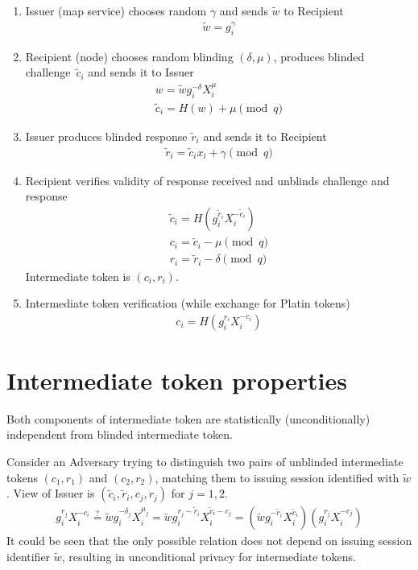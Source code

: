 \documentclass[a4paper,12pt]{article}
\begin{document}
\begin{enumerate}
\item
  Issuer (map service) chooses random $\gamma$
  and sends $\tilde w$ to Recipient
\begin{gather}
  \tilde w = g_i^{\gamma}
\end{gather}
  
\item
  Recipient (node) chooses random blinding $(\delta, \mu)$,
  produces blinded challenge~$\tilde c_i$ and sends it to Issuer
\begin{gather}
  w = \tilde w g_i^{-\delta} X_i^{\mu} \\
  \tilde c_i = H(w) + \mu  \pmod{q}
\end{gather}
\item
  Issuer produces blinded response $\tilde r_i$ and sends it to Recipient
\begin{gather}
  \tilde r_i = \tilde c_i x_i + \gamma  \pmod{q}
\end{gather}
\item
  Recipient verifies validity of response received and
  unblinds challenge and response
\begin{gather}
  \tilde c_i = H(g_i^{\tilde r_i} X_i^{- \tilde c_i}) \\
  c_i = \tilde c_i - \mu  \pmod{q} \\
  r_i = \tilde r_i - \delta  \pmod{q}
\end{gather}
  Intermediate token is $(c_i, r_i)$.
  
\item
  Intermediate token verification (while exchange for Platin tokens)
\begin{gather}
  c_i = H(g_i^{r_i} X_i^{-c_i})
\end{gather}
\end{enumerate}

\section{Intermediate token properties}

Both components of intermediate token
are statistically (unconditionally) independent from blinded intermediate token.

Consider an Adversary trying to distinguish two pairs of unblinded intermediate tokens $(c_1, r_1)$ and $(c_2, r_2)$,
matching them to issuing session identified with $\tilde w$.
View of Issuer is $(\tilde c_i, \tilde r_i, c_j, r_j)$  for $j=1,2$.
\begin{gather}
  g_i^{r_j} X_i^{-c_i} \stackrel{?}{=} \tilde w g_i^{-\delta_j} X_i^{\mu_j} =
                                    \tilde w g_i^{r_j - \tilde r_i} X_i^{\tilde c_i - c_j} =
                                    (\tilde w g_i^{- \tilde r_i} X_i^{\tilde c_i}) (g_i^{r_j} X_i^{- c_j})
\end{gather}
It could be seen that the only possible relation does not depend on issuing session identifier $\tilde w$,
resulting in unconditional privacy for intermediate tokens.
\end{document}
